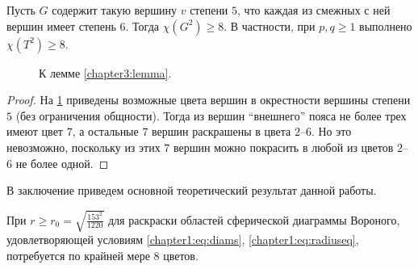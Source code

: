 \begin{lemma}\label{chapter3:lemma}
Пусть $G$ содержит такую вершину $v$ степени $5$, что каждая из смежных с ней вершин имеет степень $6$. 
Тогда $\chi(G^2) \ge 8$. В частности, при $p,q \ge 1$ выполнено $\chi(T^2) \ge 8$.
\end{lemma}

\begin{figure}[h]
\centering
\captionsetup{justification=centering}
\caption{К лемме \ref{chapter3:lemma}.}
\label{chapter3:fig:lemma}
\end{figure}

\begin{proof}
На \figurename{ \ref{chapter3:fig:lemma}} приведены возможные цвета вершин в окрестности вершины степени $5$ (без ограничения общности). 
Тогда из вершин \enquote{внешнего} пояса не более трех имеют цвет $7$, а остальные $7$ вершин раскрашены в цвета $2$--$6$. Но это невозможно, поскольку из этих $7$ вершин можно покрасить в любой из цветов $2$--$6$ не более одной. 
\end{proof}




В заключение приведем основной теоретический результат данной работы.

\begin{theorem}\label{chapter3:theorem}
При $r \geq r_0 = \sqrt{\frac{153^2}{1220}}$ для раскраски областей сферической диаграммы Вороного,
удовлетворяющей условиям \ref{chapter1:eq:diams}, \ref{chapter1:eq:radiuseq}, 
потребуется по крайней мере $8$ цветов.
\end{theorem}

